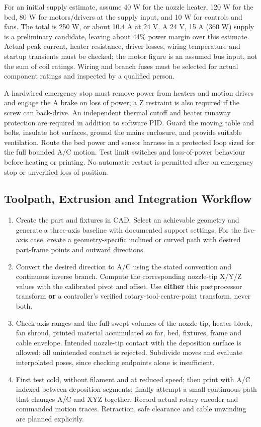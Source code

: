 \documentclass[12pt,a4paper]{article}
\providecommand{\tightlist}{\setlength{\itemsep}{0pt}\setlength{\parskip}{0pt}}
\begin{document}
For an initial supply estimate, assume 40 W for the nozzle heater, 120 W for the bed, 80 W for
  motors/drivers at the supply input, and 10 W for controls and fans. The total is 250 W, or about 10.4 A
  at 24 V. A 24 V, 15 A (360 W) supply is a preliminary candidate, leaving about 44\% power margin over
  this estimate. Actual peak current, heater resistance, driver losses, wiring temperature and startup
  transients must be checked; the motor figure is an assumed bus input, not the sum of coil ratings.
  Wiring and branch fuses must be selected for actual component ratings and inspected by a qualified
  person.

A hardwired emergency stop must remove power from heaters and motion drives and engage the A brake on
  loss of power; a Z restraint is also required if the screw can back-drive. An independent thermal
  cutoff and heater runaway protection are required in addition to software PID. Guard the moving table
  and belts, insulate hot surfaces, ground the mains enclosure, and provide suitable ventilation. Route
  the bed power and sensor harness in a protected loop sized for the full bounded A/C motion. Test limit
  switches and loss-of-power behaviour before heating or printing. No automatic restart is permitted
  after an emergency stop or unverified loss of position.

\subsection{Toolpath, Extrusion and Integration
  Workflow}\label{toolpath-extrusion-and-integration-workflow}

\begin{enumerate}
\def\labelenumi{\arabic{enumi}.}
\tightlist
\item
  Create the part and fixtures in CAD. Select an achievable geometry and generate a three-axis baseline
  with documented support settings. For the five-axis case, create a geometry-specific inclined or curved
  path with desired part-frame points and outward directions.
\item
  Convert the desired direction to A/C using the stated convention and continuous inverse branch. Compute
  the corresponding nozzle-tip X/Y/Z values with the calibrated pivot and offset. Use \textbf{either}
  this postprocessor transform \textbf{or} a controller's verified rotary-tool-centre-point transform,
  never both.
\item
  Check axis ranges and the full swept volumes of the nozzle tip, heater block, fan shroud, printed
  material accumulated so far, bed, fixtures, frame and cable envelope. Intended nozzle-tip contact with
  the deposition surface is allowed; all unintended contact is rejected. Subdivide moves and evaluate
  interpolated poses, since checking endpoints alone is insufficient.
\item
  First test cold, without filament and at reduced speed; then print with A/C indexed between deposition
  segments; finally attempt a small continuous path that changes A/C and XYZ together. Record actual
  rotary encoder and commanded motion traces. Retraction, safe clearance and cable unwinding are planned
  explicitly.
\end{enumerate}
\end{document}
